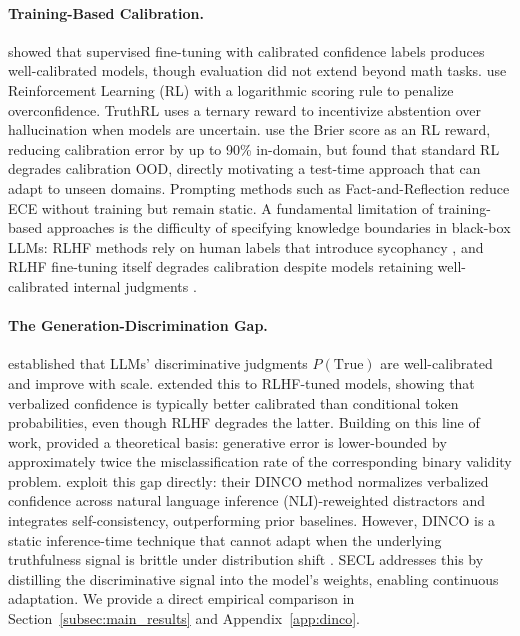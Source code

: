 \documentclass[11pt]{article}
\begin{document}
\paragraph{Training-Based Calibration.}
\citet{lin_teaching_2022} showed that supervised fine-tuning with calibrated confidence labels produces well-calibrated models, though evaluation did not extend beyond math tasks. \citet{stangel_rewarding_2025} use Reinforcement Learning (RL) with a logarithmic scoring rule to penalize overconfidence. TruthRL \cite{wei_truthrl_2025} uses a ternary reward to incentivize abstention over hallucination when models are uncertain. \citet{damani_binary_2025} use the Brier score \cite{brier_verification_1950} as an RL reward, reducing calibration error by up to 90\% in-domain, but found that standard RL degrades calibration OOD, directly motivating a test-time approach that can adapt to unseen domains.
Prompting methods such as Fact-and-Reflection \cite{zhao_factandreflection_2024} reduce ECE without training but remain static. 
A fundamental limitation of training-based approaches is the difficulty of specifying knowledge boundaries in black-box LLMs: RLHF methods rely on human labels that introduce sycophancy \cite{sharma_understanding_2024}, and RLHF fine-tuning itself degrades calibration \cite{tian_just_2023} despite models retaining well-calibrated internal judgments \cite{kadavath_language_2022}.

\paragraph{The Generation-Discrimination Gap.}
\citet{kadavath_language_2022} established that LLMs' discriminative judgments $P(\text{True})$ are well-calibrated and improve with scale.
\citet{tian_just_2023} extended this to RLHF-tuned models, showing that verbalized confidence is typically better calibrated than conditional token probabilities, even though RLHF degrades the latter.
Building on this line of work, \citet{kalai_why_2025} provided a theoretical basis: generative error is lower-bounded by approximately twice the misclassification rate of the corresponding binary validity problem.
\citet{wang_calibrating_2025} exploit this gap directly: their DINCO method normalizes verbalized confidence across natural language inference (NLI)-reweighted distractors and integrates self-consistency, outperforming prior baselines. However, DINCO is a static inference-time technique that cannot adapt when the underlying truthfulness signal is brittle under distribution shift \cite{haller_llm_2025}. SECL addresses this by distilling the discriminative signal into the model's weights, enabling continuous adaptation. We provide a direct empirical comparison in Section~\ref{subsec:main_results} and Appendix~\ref{app:dinco}.
\end{document}

